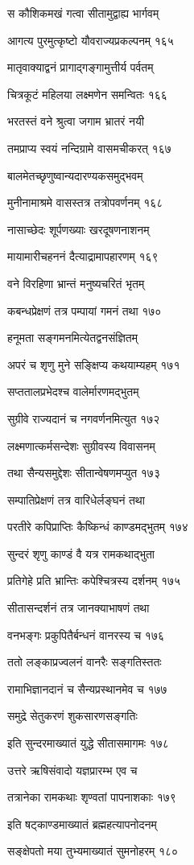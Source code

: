 स कौशिकमखं गत्वा सीतामुद्वाह्य भार्गवम्

आगत्य पुरमुत्कृष्टो यौवराज्यप्रकल्पनम् १६५

मातृवाक्याद्वनं प्रागाद्गङ्गामुत्तीर्य पर्वतम्

चित्रकूटं महिलया लक्ष्मणेन समन्वितः १६६

भरतस्तं वने श्रुत्वा जगाम भ्रातरं नयी

तमप्राप्य स्वयं नन्दिग्रामे वासमचीकरत् १६७

बालमेतच्छृणुष्वान्यदारण्यकसमुद्भवम्

मुनीनामाश्रमे वासस्तत्र तत्रोपवर्णनम् १६८

नासाच्छेदः शूर्पणख्याः खरदूषणनाशनम्

मायामारीचहननं दैत्याद्रामापहारणम् १६९

वने विरहिणा भ्रान्तं मनुष्यचरितं भृतम्

कबन्धप्रेक्षणं तत्र पम्पायां गमनं तथा १७०

हनूमता सङ्गमनमित्येतद्वनसंज्ञितम्

अपरं च शृणु मुने सङ्क्षिप्य कथयाम्यहम् १७१

सप्ततालप्रभेदश्च वालेर्मारणमद्भुतम्

सुग्रीवे राज्यदानं च नगवर्णनमित्युत १७२

लक्ष्मणात्कर्मसन्देशः सुग्रीवस्य विवासनम्

तथा सैन्यसमुद्देशः सीतान्वेषणमप्युत १७३

सम्पातिप्रेक्षणं तत्र वारिधेर्लङ्घनं तथा

परतीरे कपिप्राप्तिः कैष्किन्धं काण्डमद्भुतम् १७४

सुन्दरं शृणु काण्डं वै यत्र रामकथाद्भुता

प्रतिगेहे प्रति भ्रान्तिः कपेश्चित्रस्य दर्शनम् १७५

सीतासन्दर्शनं तत्र जानक्याभाषणं तथा

वनभङ्गः प्रकुपितैर्बन्धनं वानरस्य च १७६

ततो लङ्काप्रज्वलनं वानरैः सङ्गतिस्ततः

रामाभिज्ञानदानं च सैन्यप्रस्थानमेव च १७७

समुद्रे सेतुकरणं शुकसारणसङ्गतिः

इति सुन्दरमाख्यातं युद्धे सीतासमागमः १७८

उत्तरे ऋषिसंवादो यज्ञप्रारम्भ एव च

तत्रानेका रामकथाः शृण्वतां पापनाशकाः १७९

इति षट्काण्डमाख्यातं ब्रह्महत्यापनोदनम्

सङ्क्षेपतो मया तुभ्यमाख्यातं सुमनोहरम् १८०

